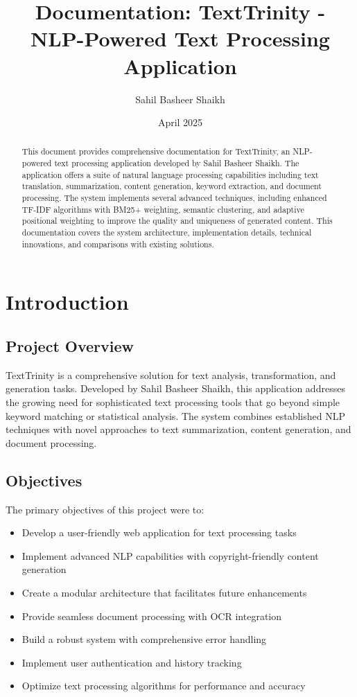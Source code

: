 \documentclass[12pt,a4paper]{article}
\title{\Huge\textbf{Documentation: TextTrinity - NLP-Powered Text Processing Application}}
\author{Sahil Basheer Shaikh}
\date{April 2025}
\begin{document}
\maketitle

\begin{abstract}
This document provides comprehensive documentation for TextTrinity, an NLP-powered text processing application developed by Sahil Basheer Shaikh. The application offers a suite of natural language processing capabilities including text translation, summarization, content generation, keyword extraction, and document processing. The system implements several advanced techniques, including enhanced TF-IDF algorithms with BM25+ weighting, semantic clustering, and adaptive positional weighting to improve the quality and uniqueness of generated content. This documentation covers the system architecture, implementation details, technical innovations, and comparisons with existing solutions.
\end{abstract}

\tableofcontents
\newpage

\section{Introduction}

\subsection{Project Overview}

TextTrinity is a comprehensive solution for text analysis, transformation, and generation tasks. Developed by Sahil Basheer Shaikh, this application addresses the growing need for sophisticated text processing tools that go beyond simple keyword matching or statistical analysis. The system combines established NLP techniques with novel approaches to text summarization, content generation, and document processing.

\subsection{Objectives}

The primary objectives of this project were to:

\begin{itemize}
    \item Develop a user-friendly web application for text processing tasks
    \item Implement advanced NLP capabilities with copyright-friendly content generation
    \item Create a modular architecture that facilitates future enhancements
    \item Provide seamless document processing with OCR integration
    \item Build a robust system with comprehensive error handling
    \item Implement user authentication and history tracking
    \item Optimize text processing algorithms for performance and accuracy
\end{itemize}
\end{document}
